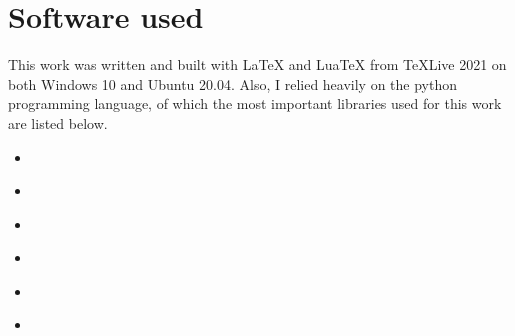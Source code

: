 \begin{table}
    \centering
    \caption{Hyperparameters for the cleaning algorithms used in the grid search. The picture quantiles
    determine what percent of all pixels per event will be below the core threshold \(Q_c\).
    The boundary threshold is calculated by multiplying the core threshold by the boundary threshold ratio.
    The time limit \(t\) is the parameter for \fact, while the time limits \(t_c\) and \(t_b\) are
    the time limits for \tcc.}
    \label{tab:hyperparameters_gridsearch}
\end{table}



\section{Software used}

This work was written and built with \LaTeX{} and Lua\TeX{} from \TeX Live 2021 on both Windows 10 and Ubuntu 20.04.
Also, I relied heavily on the python programming language, of which the most important libraries used
for this work are listed below.
\begin{itemize}
    \item \numpy{}~\cite{numpy}
    \item \pandas{}~\cite{pandas}
    \item \matplotlib{}~\cite{matplotlib}
    \item \astropy{}~\cite{astropy1, astropy2}
    \item \pyirf{}~\cite{pyirf}
    \item \sklearn{}~\cite{scikit-learn}
\end{itemize}

